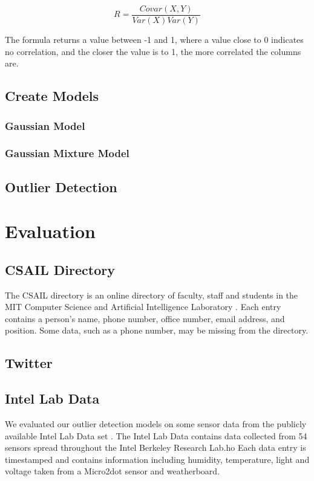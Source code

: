 \documentclass{vldb}
\begin{document}
$$
R = \frac{Covar(X,Y)}{Var(X)Var(Y)}
$$

The formula returns a value between -1 and 1, where a value close to 0 indicates no correlation, and the closer the value is to 1, the more correlated the columns are.

\subsection{Create Models}
\subsubsection{Gaussian Model}
\subsubsection{Gaussian Mixture Model}
\subsection{Outlier Detection}

\section{Evaluation}
\subsection{CSAIL Directory}
The CSAIL directory is an online directory of faculty, staff and students in the MIT Computer Science and Artificial Intelligence Laboratory \cite{CSAILDirectory}.
Each entry contains a person's name, phone number, office number, email address, and position.
Some data, such as a phone number, may be missing from the directory.

\subsection{Twitter}

\subsection{Intel Lab Data}
We evaluated our outlier detection models on some sensor data from the publicly available Intel Lab Data set \cite{IntelLabData}.
The Intel Lab Data contains data collected from 54 sensors spread throughout the Intel Berkeley Research Lab.ho
Each data entry is timestamped and contains information including humidity, temperature, light and voltage taken from a Micro2dot sensor and weatherboard.
\end{document}

